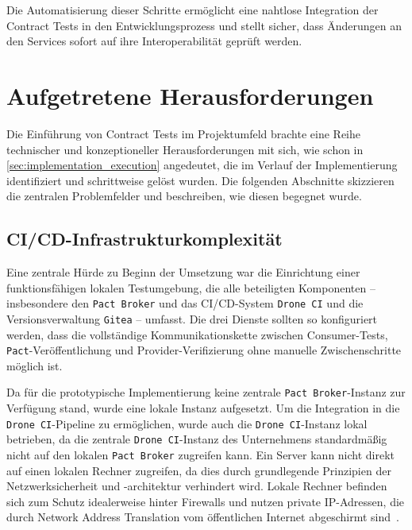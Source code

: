 Die Automatisierung dieser Schritte ermöglicht eine nahtlose Integration der Contract Tests in den Entwicklungsprozess und stellt sicher, dass Änderungen an den Services sofort auf ihre Interoperabilität geprüft werden.

\section{Aufgetretene Herausforderungen}\label{sec:implementation_challenges}

Die Einführung von Contract Tests im Projektumfeld brachte eine Reihe technischer und konzeptioneller Herausforderungen mit sich, wie schon in \cref{sec:implementation_execution} angedeutet, die im Verlauf der Implementierung identifiziert und schrittweise gelöst wurden.
Die folgenden Abschnitte skizzieren die zentralen Problemfelder und beschreiben, wie diesen begegnet wurde.

\subsection{\gls{CI}/\gls{CD}-Infrastrukturkomplexität}\label{subsec:implementation_problems_ci-infrastructure}

Eine zentrale Hürde zu Beginn der Umsetzung war die Einrichtung einer funktionsfähigen lokalen Testumgebung, die alle beteiligten Komponenten – insbesondere den \texttt{Pact Broker} und das \gls{CI}/\gls{CD}-System \texttt{Drone CI} und die Versionsverwaltung \texttt{Gitea} – umfasst.
Die drei Dienste sollten so konfiguriert werden, dass die vollständige Kommunikationskette zwischen Consumer-Tests, \texttt{Pact}-Veröffentlichung und Provider-Verifizierung ohne manuelle Zwischenschritte möglich ist.

Da für die prototypische Implementierung keine zentrale \texttt{Pact Broker}-Instanz zur Verfügung stand, wurde eine lokale Instanz aufgesetzt.
Um die Integration in die \texttt{Drone CI}-\gls{Pipeline} zu ermöglichen, wurde auch die \texttt{Drone CI}-Instanz lokal betrieben, da die zentrale \texttt{Drone CI}-Instanz des Unternehmens standardmäßig nicht auf den lokalen \texttt{Pact Broker} zugreifen kann.
Ein Server kann nicht direkt auf einen lokalen Rechner zugreifen, da dies durch grundlegende Prinzipien der Netzwerksicherheit und -architektur verhindert wird.
Lokale Rechner befinden sich zum Schutz idealerweise hinter Firewalls und nutzen private IP-Adressen, die durch Network Address Translation vom öffentlichen Internet abgeschirmt sind~\cite{moskowitzAddressAllocationPrivate1996}.

